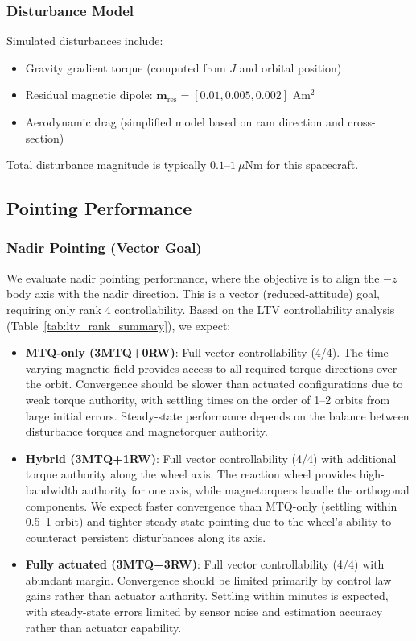 \documentclass[conference]{IEEEtran}
\begin{document}
\subsubsection{Disturbance Model}
Simulated disturbances include:
\begin{itemize}
    \item Gravity gradient torque (computed from $J$ and orbital position)
    \item Residual magnetic dipole: $\mathbf{m}_{\text{res}} = [0.01, 0.005, 0.002]$ Am$^2$
    \item Aerodynamic drag (simplified model based on ram direction and cross-section)
\end{itemize}
Total disturbance magnitude is typically $0.1$--$1~\mu$Nm for this spacecraft.

\subsection{Pointing Performance}

\subsubsection{Nadir Pointing (Vector Goal)}
We evaluate nadir pointing performance, where the objective is to align the $-z$ body axis with the nadir direction. This is a vector (reduced-attitude) goal, requiring only rank 4 controllability. Based on the LTV controllability analysis (Table~\ref{tab:ltv_rank_summary}), we expect:

\begin{itemize}
    \item \textbf{MTQ-only (3MTQ+0RW)}: Full vector controllability (4/4). The time-varying magnetic field provides access to all required torque directions over the orbit. Convergence should be slower than actuated configurations due to weak torque authority, with settling times on the order of 1--2 orbits from large initial errors. Steady-state performance depends on the balance between disturbance torques and magnetorquer authority.

    \item \textbf{Hybrid (3MTQ+1RW)}: Full vector controllability (4/4) with additional torque authority along the wheel axis. The reaction wheel provides high-bandwidth authority for one axis, while magnetorquers handle the orthogonal components. We expect faster convergence than MTQ-only (settling within 0.5--1 orbit) and tighter steady-state pointing due to the wheel's ability to counteract persistent disturbances along its axis.

    \item \textbf{Fully actuated (3MTQ+3RW)}: Full vector controllability (4/4) with abundant margin. Convergence should be limited primarily by control law gains rather than actuator authority. Settling within minutes is expected, with steady-state errors limited by sensor noise and estimation accuracy rather than actuator capability.
\end{itemize}
\end{document}
